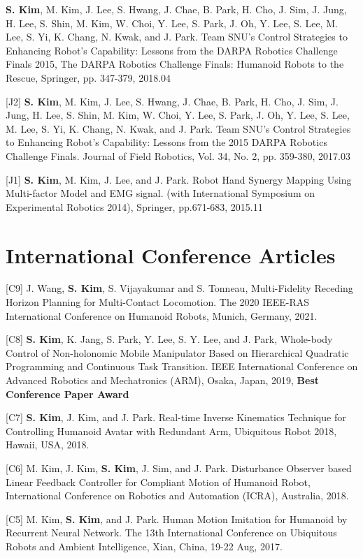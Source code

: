 \documentclass[margin,line]{res}
\begin{document}
\begin{resume}
    [J3] \textbf{S. Kim}, M. Kim, J. Lee, S. Hwang, J. Chae, B. Park, H. Cho, J. Sim, J. Jung, H. Lee, S. Shin, M. Kim, W. Choi, Y. Lee, S. Park, J. Oh, Y. Lee, S. Lee, M. Lee, S. Yi, K. Chang, N. Kwak, and {J. Park}.
  Team SNU’s Control Strategies to Enhancing Robot’s Capability: Lessons from the DARPA Robotics Challenge Finals 2015, The DARPA Robotics Challenge Finals: Humanoid Robots to the Rescue, Springer, pp. 347-379, 2018.04

    [J2] \textbf{S. Kim}, M. Kim, J. Lee, S. Hwang, J. Chae, B. Park, H. Cho, J. Sim, J. Jung, H. Lee, S. Shin, M. Kim, W. Choi, Y. Lee, S. Park, J. Oh, Y. Lee, S. Lee, M. Lee, S. Yi, K. Chang, N. Kwak, and {J. Park}.
  Team SNU’s Control Strategies to Enhancing Robot’s Capability: Lessons from the 2015 DARPA Robotics Challenge Finals. Journal of Field Robotics, Vol. 34, No. 2, pp. 359-380, 2017.03

    [J1] \textbf{S. Kim}, M. Kim, J. Lee, and {J. Park}.
  Robot Hand Synergy Mapping Using Multi-factor Model and EMG signal.
  (with International Symposium on Experimental Robotics 2014), Springer, pp.671-683, 2015.11

  \section{\sc International Conference Articles}

   [C9] J. Wang, \textbf{S. Kim}, S. Vijayakumar and S. Tonneau, Multi-Fidelity Receding Horizon Planning for Multi-Contact Locomotion. The 2020 IEEE-RAS International Conference on Humanoid Robots, Munich, Germany, 2021.

    [C8] \textbf{S. Kim}, K. Jang, S. Park, Y. Lee, S. Y. Lee, and J. Park, Whole-body Control of Non-holonomic Mobile Manipulator Based on Hierarchical Quadratic Programming and Continuous Task Transition. IEEE International Conference on Advanced Robotics and Mechatronics (ARM), Osaka, Japan, 2019, \textbf{Best Conference Paper Award}

  [C7] \textbf{S. Kim}, J. Kim, and J. Park.
  Real-time Inverse Kinematics Technique for Controlling Humanoid Avatar with Redundant Arm,
  Ubiquitous Robot 2018, Hawaii, USA, 2018.

    [C6] M. Kim, J. Kim, \textbf{S. Kim}, J. Sim, and J. Park.
  Disturbance Observer based Linear Feedback Controller for Compliant Motion of Humanoid Robot,
  International Conference on Robotics and Automation (ICRA), Australia, 2018.

    [C5] M. Kim, \textbf{S. Kim}, and {J. Park}.
  Human Motion Imitation for Humanoid by Recurrent Neural Network.
  The 13th International Conference on Ubiquitous Robots and Ambient Intelligence,
  Xian, China, 19-22 Aug, 2017.


\end{resume}
\end{document}

